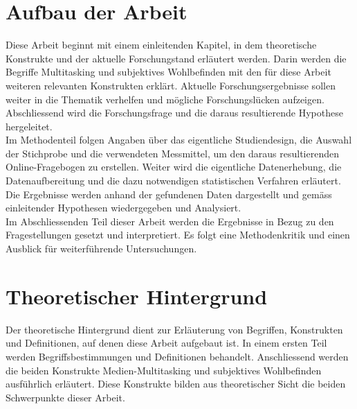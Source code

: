 \section{Aufbau der Arbeit}\label{section.einleitung.aufbau}
Diese Arbeit beginnt mit einem einleitenden Kapitel, in dem theoretische Konstrukte und der aktuelle Forschungstand erläutert werden. Darin werden die Begriffe Multitasking und subjektives Wohlbefinden mit den für diese Arbeit weiteren relevanten Konstrukten erklärt. Aktuelle Forschungsergebnisse sollen weiter in die Thematik verhelfen und mögliche Forschungslücken aufzeigen. Abschliessend wird die Forschungsfrage und die daraus resultierende Hypothese hergeleitet.\\
Im Methodenteil folgen Angaben über das eigentliche Studiendesign, die Auswahl der Stichprobe und die verwendeten Messmittel, um den daraus resultierenden Online-Fragebogen zu erstellen. Weiter wird die eigentliche Datenerhebung, die Datenaufbereitung und die dazu notwendigen statistischen Verfahren erläutert.\\
Die Ergebnisse werden anhand der gefundenen Daten dargestellt und gemäss einleitender Hypothesen wiedergegeben und Analysiert.\\
Im Abschliessenden Teil dieser Arbeit werden die Ergebnisse in Bezug zu den Fragestellungen gesetzt und interpretiert. Es folgt eine Methodenkritik und einen Ausblick für weiterführende Untersuchungen.
\section{Theoretischer Hintergrund}\label{section.einleitung.theoHintegrund}
Der theoretische Hintergrund dient zur Erläuterung von Begriffen, Konstrukten und Definitionen, auf denen diese Arbeit aufgebaut ist. In einem ersten Teil werden Begriffsbestimmungen und Definitionen behandelt. Anschliessend werden die beiden Konstrukte Medien-Multitasking und subjektives Wohlbefinden ausführlich erläutert. Diese Konstrukte bilden aus theoretischer Sicht die beiden Schwerpunkte dieser Arbeit.
